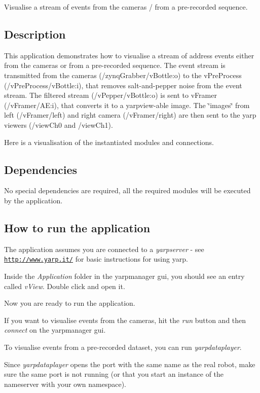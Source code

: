Visualise a stream of events from the cameras / from a pre-\/recorded sequence.

\subsection*{Description}

This application demonstrates how to visualise a stream of address events either from the cameras or from a pre-\/recorded sequence. The event stream is transmitted from the cameras (/zynq\+Grabber/v\+Bottle\+:o) to the v\+Pre\+Process (/v\+Pre\+Process/v\+Bottle\+:i), that removes salt-\/and-\/pepper noise from the event stream. The filtered stream (/v\+Pepper/v\+Bottle\+:o) is sent to v\+Framer (/v\+Framer/\+AE\+:i), that converts it to a yarpview-\/able image. The \char`\"{}images\char`\"{} from left (/v\+Framer/left) and right camera (/v\+Framer/right) are then sent to the yarp viewers (/view\+Ch0 and /view\+Ch1).

Here is a visualisation of the instantiated modules and connections.



\subsection*{Dependencies}

No special dependencies are required, all the required modules will be executed by the application.

\subsection*{How to run the application}

The application assumes you are connected to a {\itshape yarpserver} -\/ see \href{http://www.yarp.it/}{\tt http\+://www.\+yarp.\+it/} for basic instructions for using yarp.

Inside the {\itshape Application} folder in the yarpmanager gui, you should see an entry called {\itshape v\+View}. Double click and open it.

Now you are ready to run the application.

If you want to visualise events from the cameras, hit the {\itshape run} button and then {\itshape connect} on the yarpmanager gui.

To visualise events from a pre-\/recorded dataset, you can run {\itshape yarpdataplayer}.

Since {\itshape yarpdataplayer} opens the port with the same name as the real robot, make sure the same port is not running (or that you start an instance of the nameserver with your own namespace). 